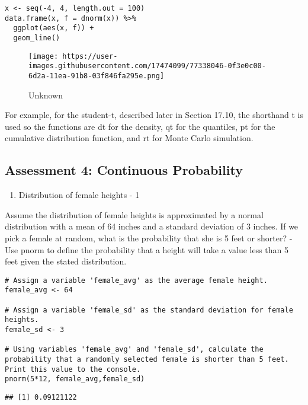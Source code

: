 \documentclass[
]{article}
\providecommand{\tightlist}{%
  \setlength{\itemsep}{0pt}\setlength{\parskip}{0pt}}
\begin{document}
\begin{verbatim}
x <- seq(-4, 4, length.out = 100)
data.frame(x, f = dnorm(x)) %>% 
  ggplot(aes(x, f)) + 
  geom_line()
\end{verbatim}

\begin{figure}
\centering
\texttt{[image: https://user-images.githubusercontent.com/17474099/77338046-0f3e0c00-6d2a-11ea-91b8-03f846fa295e.png]}
\caption{Unknown}
\end{figure}

For example, for the student-t, described later in Section 17.10, the
shorthand t is used so the functions are dt for the density, qt for the
quantiles, pt for the cumulative distribution function, and rt for Monte
Carlo simulation.

\hypertarget{assessment-4-continuous-probability}{%
\subsection{Assessment 4: Continuous
Probability}\label{assessment-4-continuous-probability}}

\begin{enumerate}
\def\labelenumi{\arabic{enumi}.}
\tightlist
\item
  Distribution of female heights - 1
\end{enumerate}

Assume the distribution of female heights is approximated by a normal
distribution with a mean of 64 inches and a standard deviation of 3
inches. If we pick a female at random, what is the probability that she
is 5 feet or shorter? - Use pnorm to define the probability that a
height will take a value less than 5 feet given the stated distribution.

\begin{verbatim}
# Assign a variable 'female_avg' as the average female height.
female_avg <- 64

# Assign a variable 'female_sd' as the standard deviation for female heights.
female_sd <- 3

# Using variables 'female_avg' and 'female_sd', calculate the probability that a randomly selected female is shorter than 5 feet. Print this value to the console.
pnorm(5*12, female_avg,female_sd)
\end{verbatim}

\begin{verbatim}
## [1] 0.09121122
\end{verbatim}
\end{document}
